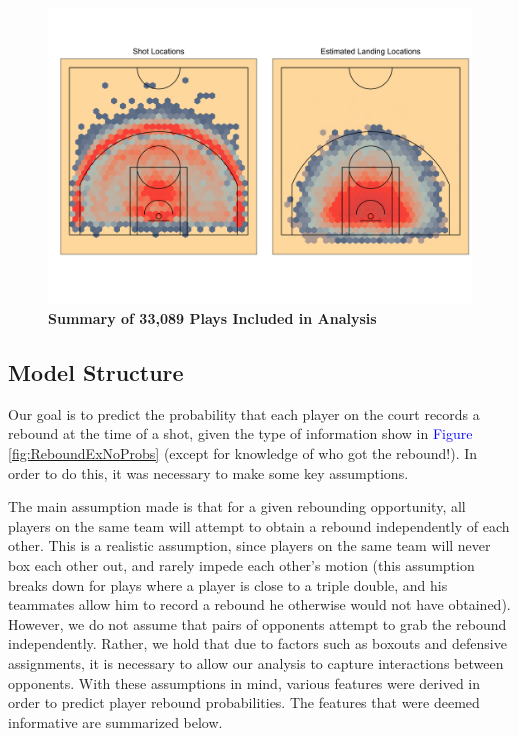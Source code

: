 \documentclass{article}
\begin{document}
\begin{figure}[htb]
\centering
\includegraphics[width=.9\columnwidth]{EDAplots.png}
\caption{\bf{Summary of 33,089 Plays Included in Analysis}}
\label{fig:QAHeatMaps}
\end{figure}

\subsection{Model Structure}

\bigbreak
\noindent
Our goal is to predict the probability that each player on the court records a rebound at the time of a shot, given the type of information show in \textcolor{blue}{Figure} \ref{fig:ReboundExNoProbs} (except for knowledge of who got the rebound!). In order to do this, it was necessary to make some key assumptions. 

\bigbreak
\noindent
The main assumption made is that for a given rebounding opportunity, all players on the same team will attempt to obtain a rebound independently of each other. This is a realistic assumption, since players on the same team will never box each other out, and rarely impede each other's motion (this assumption breaks down for plays where a player is close to a triple double, and his teammates allow him to record a rebound he otherwise would not have obtained). However, we do not assume that pairs of opponents attempt to grab the rebound independently. Rather, we hold that due to factors such as boxouts and defensive assignments, it is necessary to allow our analysis to capture interactions between opponents. With these assumptions in mind, various features were derived in order to predict player rebound probabilities. The features that were deemed informative are summarized below.
\end{document}
